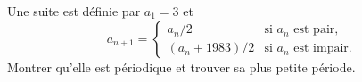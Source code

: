 Une suite est définie par $a_1 = 3$ et
\[ a_{n+1} = \begin{cases} a_n/2 & \text{si } a_n \text{ est pair,}\\ (a_n + 1983)/2 & \text{si } a_n \text{ est impair.} \end{cases} \]
Montrer qu'elle est périodique et trouver sa plus petite période.
